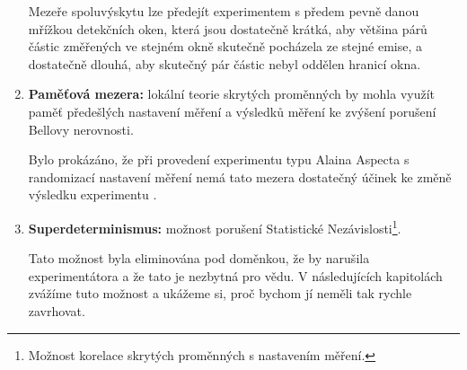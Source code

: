 \begin{enumerate}
        Mezeře spoluvýskytu lze předejít experimentem s předem pevně danou mřížkou detekčních oken, která jsou dostatečně krátká, aby většina párů částic změřených ve stejném okně skutečně pocházela ze stejné emise, a dostatečně dlouhá, aby skutečný pár částic nebyl oddělen hranicí okna.

        \item \textbf{Paměťová mezera:} lokální teorie skrytých proměnných by mohla využít paměť předešlých nastavení měření a výsledků měření ke zvýšení porušení Bellovy nerovnosti.
        
        Bylo prokázáno, že při provedení experimentu typu Alaina Aspecta \parencite*{belltest:2} s randomizací nastavení měření nemá tato mezera dostatečný účinek ke změně výsledku experimentu \parencite{measloop:1}\parencite{measloop:2}\parencite{measloop:3}.

        \clearpage
        
        \item \textbf{Superdeterminismus:} možnost porušení Statistické Nezávislosti\footnote[5]{Možnost korelace skrytých proměnných s nastavením měření.}.
        
        Tato možnost byla eliminována pod doměnkou, že by narušila  experimentátora a že tato  je nezbytná pro vědu. V následujících kapitolách zvážíme tuto možnost a ukážeme si, proč bychom jí neměli tak rychle zavrhovat.
    \end{enumerate}
    